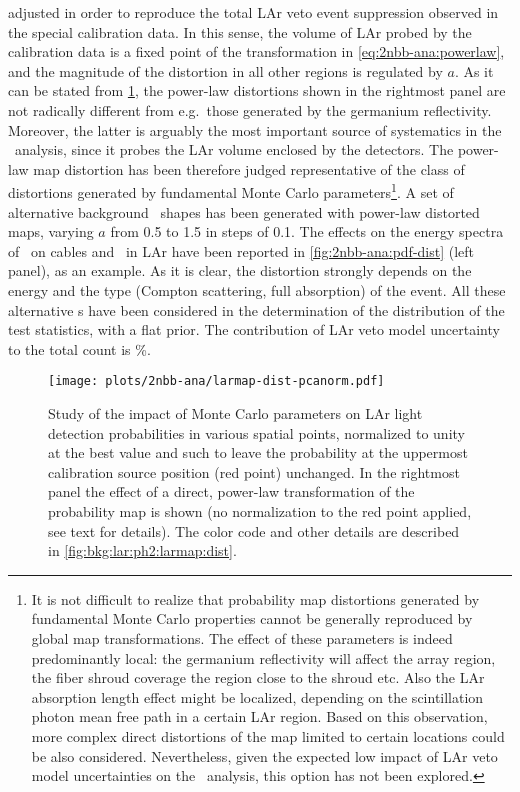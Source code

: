 \begin{description}[wide]
    adjusted in order to reproduce the total LAr veto event suppression observed in the
    special calibration data. In this sense, the volume of LAr probed by the calibration
    data is a fixed point of the transformation in \cref{eq:2nbb-ana:powerlaw}, and the
    magnitude of the distortion in all other regions is regulated by $a$.
    \newpar
    As it can be stated from \cref{fig:2nbb-ana:dist-pcanorm}, the power-law distortions
    shown in the rightmost panel are not radically different from e.g.~those generated by
    the germanium reflectivity. Moreover, the latter is arguably the most important source
    of systematics in the \nnbb\ analysis, since it probes the LAr volume enclosed by the
    detectors. The power-law map distortion has been therefore judged representative
    of the class of distortions generated by fundamental Monte Carlo parameters\footnote{%
      It is not difficult to realize that probability map distortions generated by
      fundamental Monte Carlo properties cannot be generally reproduced by global map
      transformations. The effect of these parameters is indeed predominantly local: the
      germanium reflectivity will affect the array region, the fiber shroud coverage the
      region close to the shroud etc. Also the LAr absorption length effect might be
      localized, depending on the scintillation photon mean free path in a certain LAr
      region.  Based on this observation, more complex direct distortions of the map
      limited to certain locations could be also considered. Nevertheless, given the
      expected low impact of LAr veto model uncertainties on the \nnbb\ analysis, this
      option has not been explored.
    }.
    \newpar
    A set of alternative background \pdf\ shapes has been generated with power-law distorted
    maps, varying $a$ from 0.5 to 1.5 in steps of 0.1. The effects on the energy
    spectra of \kvn\ on cables and \kvz\ in LAr have been reported in
    \cref{fig:2nbb-ana:pdf-dist} (left panel), as an example. As it is clear, the
    distortion strongly depends on the energy and the type (Compton scattering, full
    absorption) of the event. All these alternative \pdf{}s have been considered in the
    determination of the distribution of the test statistics, with a flat prior. The
    contribution of LAr veto model uncertainty to the total count is \%.

    \begin{figure}
      \centering
      \texttt{[image: plots/2nbb-ana/larmap-dist-pcanorm.pdf]}
      \caption{%
        Study of the impact of Monte Carlo parameters on LAr light detection probabilities in
        various spatial points, normalized to unity at the best value and such to leave the
        probability at the uppermost calibration source position (red point) unchanged. In
        the rightmost panel the effect of a direct, power-law transformation of the
        probability map is shown (no normalization to the red point applied, see text for
        details). The color code and other details are described in
        \cref{fig:bkg:lar:ph2:larmap:dist}.
      }\label{fig:2nbb-ana:dist-pcanorm}
    \end{figure}


\end{description}
